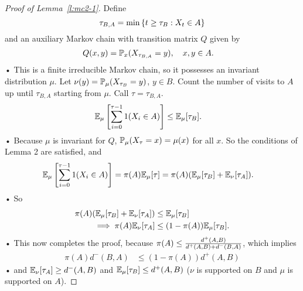 \begin{proof}[Proof of Lemma~\ref{l:mc2-1}]
Define $$\tau_{B,A} = \min\left\{{t\ge \tau_B}:{X_t\in A}\right\}$$
and an auxiliary Markov chain with transition matrix $Q$ given by 
\begin{align*}
Q(x,y) &= \mathbb{P}_x(X_{\tau_{B,A}}=y), \quad x,y\in A.
\end{align*}•
This is a finite irreducible Markov chain, so it possesses an invariant distribution $\mu$. Let $\nu(y)=\mathbb{P}_\mu(X_{\tau_B}=y)$, $y\in B$.
Count the number of visits to $A$ up until $\tau_{B,A}$ starting from $\mu$. Call $\tau=\tau_{B,A}$.
\begin{align*}
\mathbb{E}_\mu\left[ {\sum_{i=0}^{\tau-1} 1(X_i\in A)} \right]&\le \mathbb{E}_\mu[\tau_B].
\end{align*}•
Because $\mu$ is invariant for $Q$, $\mathbb{P}_\mu(X_\tau=x)=\mu(x)$ for all $x$.
So the conditions of Lemma 2 are satisfied, and
\begin{align*}
\mathbb{E}_\mu\left[ {\sum_{i=0}^{\tau-1} 1(X_i\in A)} \right]&= \pi(A) \mathbb{E}_\mu[\tau] = \pi(A) (\mathbb{E}_\mu[\tau_B]+\mathbb{E}_\nu[\tau_A]). 
\end{align*}•
So
\begin{align*}
\pi(A) (\mathbb{E}_\mu[\tau_B] + \mathbb{E}_\nu[\tau_A]) &\le \mathbb{E}_\mu[\tau_B]\\
\implies
\pi(A) \mathbb{E}_\nu [\tau_A] &\le (1-\pi(A))\mathbb{E}_\mu[\tau_B]. 
\end{align*}•
This now completes the proof, because $\pi(A) \le \frac{d^+(A,B)}{d^+(A,B) + d^-(B,A)}$, which implies
\begin{align*}
\pi(A) d^-(B,A) &\le (1-\pi(A))d^+(A,B)
\end{align*}•
and $\mathbb{E}_\nu[\tau_A]\ge d^-(A,B)$ and $\mathbb{E}_\mu[\tau_B]\le d^+(A,B)$ ($\nu$ is supported on $B$ and $\mu$ is supported on $A$). 
\end{proof}

